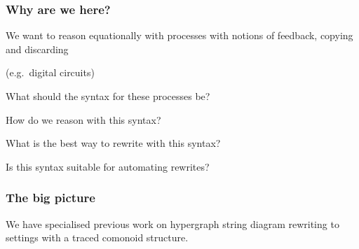 \begin{frame}
    \frametitle{Why are we here?}

    \pause
    \centering
    \LARGE

    We want to reason \alert{equationally} with \alert{processes} with notions of
    \alert{feedback}, \alert{copying} and \alert{discarding}

    \normalsize
    (e.g.\ \alert{digital circuits})

    \large
    \pause

    \vspace{1em}

    What should the \alert{syntax} for these processes be?

    \pause

    How do we \alert{reason} with this syntax?

    \pause

    What is the best way to \alert{rewrite} with this syntax?

    \pause

    Is this syntax suitable for \alert{automating} rewrites?

\end{frame}
\begin{frame}
    \frametitle{The big picture}

    \centering
    \LARGE

    We have \alert{specialised} previous work on
    \alert{hypergraph string diagram rewriting} to settings with a
    \alert{traced comonoid structure}.

\end{frame}


